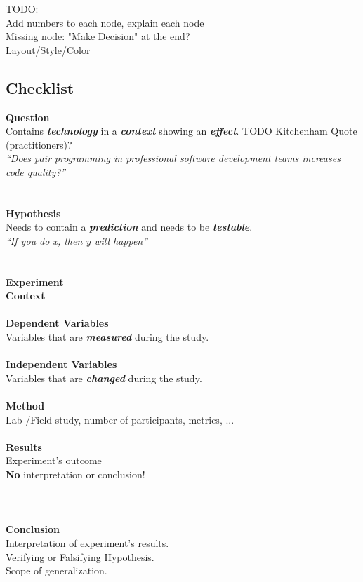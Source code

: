 TODO:\\
Add numbers to each node, explain each node\\
Missing node: "Make Decision" at the end?\\
Layout/Style/Color


\newcommand{\exampleQuote}[1]{\small{\textit{``#1''}}}

\subsection{Checklist}

{\large\textbf{Question}}\\
Contains \textbf{\textit{technology}} in a \textbf{\textit{context}} showing an \textbf{\textit{effect}}. TODO Kitchenham Quote (practitioners)?\\
\exampleQuote{Does pair programming in professional software development teams increases code quality?}
\\
\\
\\
{\large\textbf{Hypothesis}}\\
Needs to contain a \textbf{\textit{prediction}} and needs to be \textbf{\textit{testable}}.\\
\exampleQuote{If you do x, then y will happen}
\\
\\
\\
{\large\textbf{Experiment}}\\
\textbf{Context}\\
\\
\textbf{Dependent Variables}\\
Variables that are  \textbf{\textit{measured}} during the study.\\
\\
\textbf{Independent Variables}\\
Variables that are  \textbf{\textit{changed}} during the study.\\
\\
\textbf{Method}\\
Lab-/Field study, number of participants, metrics, ...\\
\\
\textbf{Results}\\
Experiment's outcome\\
\textbf{No} interpretation or conclusion!\\
\\
\\
\\
{\large\textbf{Conclusion}}\\
Interpretation of experiment's results.\\
Verifying or Falsifying Hypothesis.\\
Scope of generalization.









